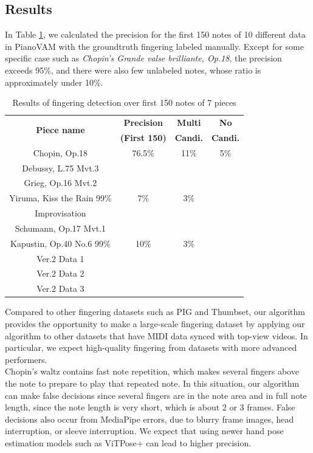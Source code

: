 \documentclass{article}
\begin{document}
\subsection{Results}
In Table \ref{tab:fingering_results}, we calculated the precision for the first 150 notes of 10 different data in PianoVAM with the groundtruth fingering labeled manually. Except for some specific case such as \textit{Chopin's Grande valse brilliante, Op.18}, the precision exceeds 95\%, and there were also few unlabeled notes, whose ratio is approximately under 10\%.
\begin{table}[htbp]
\centering
\small
\caption{Results of fingering detection over first 150 notes of 7 pieces}
\label{tab:fingering_results}
\begin{center}
\begin{tabular}{c c c c}
\toprule
\multirow{2}{*}{\textbf{Piece name}} &  \textbf{Precision} & \textbf{Multi}  & \textbf{No} \\                                         &  \textbf{(First 150)} & \textbf{Candi.} & \textbf{Candi.}\\
\midrule
Chopin, Op.18 & 76.5\% & 11\% & 5\% \\
Debussy, L.75 Mvt.3 & & & \\
Grieg, Op.16 Mvt.2 & & & \\
Yiruma, Kiss the Rain 99\% & 7\% & 3\% & \\
Improvisation & & & \\
Schumann, Op.17 Mvt.1 & & & \\
Kapustin, Op.40 No.6 99\% & 10\% & 3\% & \\
Ver.2 Data 1 & & & \\
Ver.2 Data 2 & & & \\
Ver.2 Data 3 & & & \\
\midrule
\end{tabular}
\end{center}
\end{table}
Compared to other fingering datasets such as PIG\cite{} and Thumbset\cite{}, our algorithm provides the opportunity to make a large-scale fingering dataset by applying our algorithm to other datasets that have MIDI data synced with top-view videos. In particular, we expect high-quality fingering from datasets with more advanced performers. \\ 
Chopin's waltz contains fast note repetition, which makes several fingers above the note to prepare to play that repeated note. In this situation, our algorithm can make false decisions since several fingers are in the note area and in full note length, since the note length is very short, which is about 2 or 3 frames. False decisions also occur from MediaPipe errors, due to blurry frame images, head interruption, or sleeve interruption. We expect that using newer hand pose estimation models such as ViTPose+ \cite{} can lead to higher precision.
\end{document}
